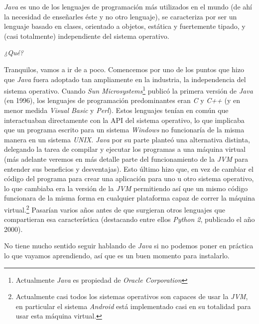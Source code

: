 \textit{Java} es uno de los lenguajes de programación más utilizados en el mundo (de ahí la 
necesidad de enseñarles éste y no otro lenguaje), se caracteriza por ser un lenguaje basado en 
clases, orientado a objetos, estática y fuertemente tipado, y (casi totalmente) independiente del sistema 
operativo.

\begin{center}
  \textit{¿Qué?}
\end{center}

Tranquilos, vamos a ir de a poco.
Comencemos por uno de los puntos que hizo que \textit{Java} fuera adoptado tan ampliamente en la
industria, la independencia del sistema operativo.
Cuando \textit{Sun Microsystems}\footnote{Actualmente \textit{Java} es propiedad de 
\textit{Oracle Corporation}} publicó la primera versión de \textit{Java} (en 1996), los 
lenguajes de programación predominantes eran \textit{C} y \textit{C++} (y en menor medida 
\textit{Visual Basic} y \textit{Perl}).
Estos lenguajes tenían en común que interactuaban directamente con la API del sistema operativo,
lo que implicaba que un programa escrito para un sistema \textit{Windows} no funcionaría de la
misma manera en un sistema \textit{UNIX}.
\textit{Java} por su parte planteó una alternativa distinta, delegando la tarea de compilar y 
ejecutar los programas a una máquina virtual (más adelante veremos en más detalle parte del 
funcionamiento de la \textit{JVM} para entender sus beneficios y desventajas).
Esto último hizo que, en vez de cambiar el código del programa para crear una aplicación para 
uno u otro sistema operativo, lo que cambiaba era la versión de la \textit{JVM} permitiendo así
que un mismo código funcionara de la misma forma en cualquier plataforma capaz de correr la 
máquina virtual.\footnote{Actualmente casi todos los sistemas operativos son capaces de usar la 
\textit{JVM}, en particular el sistema \textit{Android} está implementado casi en su totalidad 
para usar esta máquina virtual.}
Pasarían varios años antes de que surgieran otros lenguajes que compartieran esa característica
(destacando entre ellos \textit{Python 2}, publicado el año 2000).

No tiene mucho sentido seguir hablando de \textit{Java} si no podemos poner en práctica lo que 
vayamos aprendiendo, así que es un buen momento para instalarlo.